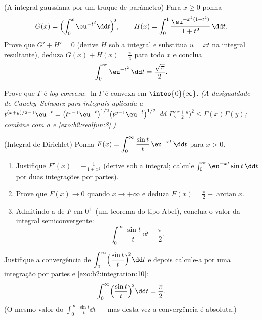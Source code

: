 \begin{exercise}[$\star\star\star$]\label{exo:b2:integration:8}
(A integral gaussiana por um truque de parâmetro) Para $x \geq 0$ ponha
\[
G(x) = \Bigl(\int_0^x \eu^{-t^2}\dd t\Bigr)^{\!2},
\qquad
H(x) = \int_0^1 \frac{\eu^{-x^2(1+t^2)}}{1 + t^2}\,\dd t .
\]
Prove que $G' + H' = 0$ (derive $H$ sob a integral e
substitua $u = xt$ na integral resultante), deduza $G(x) + H(x)
= \frac\pi4$ para todo $x$ e conclua
\[
\int_0^{\infty} \eu^{-t^2}\,\dd t = \frac{\sqrt\pi}{2} .
\]
\end{exercise}

\begin{exercise}[$\star\star\star$]\label{exo:b2:integration:9}
Prove que $\Gamma$ é \emph{log-convexa}: $\ln\Gamma$ é convexa em
$\intoo{0}{\infty}$. \emph{(A desigualdade de Cauchy--Schwarz para integrais aplicada
a $t^{(x+y)/2 - 1}\eu^{-t} = \bigl(t^{x-1}\eu^{-t}\bigr)^{1/2}
\bigl(t^{y-1}\eu^{-t}\bigr)^{1/2}$ dá
$\Gamma\bigl(\frac{x+y}{2}\bigr)^2 \leq \Gamma(x)\Gamma(y)$;
combine com a  e \cref{exo:b2:realfun:8}.)}
\end{exercise}

\begin{exercise}[$\star\star\star$]\label{exo:b2:integration:10}
(Integral de Dirichlet) Ponha $F(x) = \displaystyle\int_0^{\infty}
\frac{\sin t}{t}\,\eu^{-xt}\,\dd t$ para $x > 0$.
\begin{enumerate}
  \item Justifique $F'(x) = -\frac{1}{1 + x^2}$ (derive sob
        a integral; calcule $\int_0^\infty \eu^{-xt}\sin t\,\dd
        t$ por duas integrações por partes).
  \item Prove que $F(x) \to 0$ quando $x \to +\infty$ e deduza $F(x) =
        \frac\pi2 - \arctan x$.
  \item Admitindo a  de $F$ em $0^+$ (um teorema
        do tipo Abel), conclua o valor da integral
        semiconvergente:
        \[
        \int_0^{\infty} \frac{\sin t}{t}\,\dd t = \frac{\pi}{2}.
        \]
\end{enumerate}
\end{exercise}

\begin{exercise}[$\star\star$]\label{exo:b2:integration:11}
Justifique a convergência de $\displaystyle\int_0^\infty
\Bigl(\frac{\sin t}{t}\Bigr)^{\!2}\dd t$ e depois calcule-a por uma
integração por partes e \cref{exo:b2:integration:10}:
\[
\int_0^\infty \Bigl(\frac{\sin t}{t}\Bigr)^{\!2}\dd t
= \frac{\pi}{2} .
\]
(O mesmo valor do $\int_0^\infty \frac{\sin t}{t}\dd t$ --- mas
desta vez a convergência é absoluta.)
\end{exercise}

